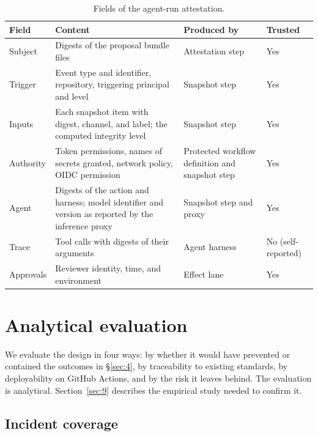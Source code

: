 \documentclass[acmsmall,screen,review]{acmart}
\begin{document}
\begin{table}[htbp]
\caption{Fields of the agent-run attestation.}
\label{tab:3}
\footnotesize
\begin{tabularx}{\linewidth}{@{}>{\hsize=0.527\hsize\raggedright\arraybackslash}X>{\hsize=2.251\hsize\raggedright\arraybackslash}X>{\hsize=0.694\hsize\raggedright\arraybackslash}X>{\hsize=0.527\hsize\raggedright\arraybackslash}X@{}}
\toprule
\textbf{Field} & \textbf{Content} & \textbf{Produced by} & \textbf{Trusted} \\
\midrule
Subject & Digests of the proposal bundle files & Attestation step & Yes \\
Trigger & Event type and identifier, repository, triggering principal and level & Snapshot step & Yes \\
Inputs & Each snapshot item with digest, channel, and label; the computed integrity level & Snapshot step & Yes \\
Authority & Token permissions, names of secrets granted, network policy, OIDC permission & Protected workflow definition and snapshot step & Yes \\
Agent & Digests of the action and harness; model identifier and version as reported by the inference proxy & Snapshot step and proxy & Yes \\
Trace & Tool calls with digests of their arguments & Agent harness & No (self-reported) \\
Approvals & Reviewer identity, time, and environment & Effect lane & Yes \\
\bottomrule
\end{tabularx}
\end{table}


\section{Analytical evaluation}\label{sec:8}

We evaluate the design in four ways: by whether it would have prevented or contained the outcomes in \S\ref{sec:4}, by traceability to existing standards, by deployability on GitHub Actions, and by the risk it leaves behind. The evaluation is analytical. Section~\ref{sec:9} describes the empirical study needed to confirm it.


\subsection{Incident coverage}\label{sec:8.1}
\end{document}
